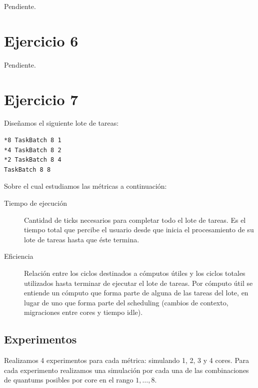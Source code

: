 \documentclass[a4paper,10pt,twoside]{article}
\begin{document}
Pendiente.




\section{Ejercicio 6}

Pendiente.




\section{Ejercicio 7}

Diseñamos el siguiente lote de tareas:

\begin{verbatim}
*8 TaskBatch 8 1
*4 TaskBatch 8 2
*2 TaskBatch 8 4
TaskBatch 8 8
\end{verbatim}

Sobre el cual estudiamos las métricas a continuación:

\begin{description}
	\item[Tiempo de ejecución]
	Cantidad de ticks necesarios para completar todo el lote de tareas. Es el tiempo total que percibe el usuario desde que inicia el procesamiento de su lote de tareas hasta que éste termina.

	\item[Eficiencia]
	Relación entre los ciclos destinados a cómputos útiles y los ciclos totales utilizados hasta terminar de ejecutar el lote de tareas. Por cómputo útil se entiende un cómputo que forma parte de alguna de las tareas del lote, en lugar de uno que forma parte del scheduling (cambios de contexto, migraciones entre cores y tiempo idle).
\end{description}


\subsection{Experimentos}

Realizamos 4 experimentos para cada métrica: simulando 1, 2, 3 y 4 cores. Para cada experimento realizamos una simulación por cada una de las combinaciones de quantums posibles por core en el rango $1, \ldots, 8$.
\end{document}
